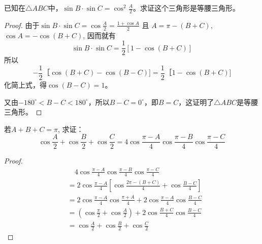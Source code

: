     

\begin{example}
    已知在$\triangle ABC$中，$\sin B\cdot \sin C=\cos^2\frac{A}{2}$。求证这个三角形是等腰三角形。
\end{example}


\begin{proof}
由于$\sin B\cdot \sin C=\cos\frac{A}{2}=\frac{1+\cos A}{2}$
且 $A=\pi-(B+C)$, $\cos A=-\cos(B+C)$, 因而就有
\[\sin B\cdot \sin C =\frac{1}{2} [1-\cos (B+C) ] \]
所以
\[-\frac{1}{2}［\cos (B+C) -\cos (B-C) ]
=\frac{1}{2}［1-\cos (B+C)]\]
化简上式，得$\cos (B-C) =1$。

又由$-180^{\circ}<B-C<180^{\circ}$，所以$B-C=0^{\circ}$，即$B=C$，这证明了$\triangle ABC$是等腰三角形。    
\end{proof}


\begin{example}
若$A+B+C=\pi$, 求证：
$$\cos\frac{A}{2}+\cos \frac{B}{2}+\cos \frac{C}{2}=4\cos\frac{\pi-A}{4}\cos\frac{\pi-B}{4}\cos\frac{\pi-C}{4}$$  
\end{example}

\begin{proof}
\[\begin{split}
&\quad  4\cos\frac{\pi-A}{4}\cos\frac{\pi-B}{4}\cos\frac{\pi-C}{4}\\
&= 2\cos\frac{\pi-A}{4}\left[\cos\frac{2\pi-(B+C)}{4}+\cos\frac{B-C}{4}\right]\\
&= 2\cos\frac{\pi-A}{4}  \cos\frac{\pi+A}{4} +2\cos\frac{\pi-A}{4} \cos\frac{B-C}{4} \\
&=\left(\cos\frac{\pi}{2}+\cos\frac{A}{2}\right)+2\cos\frac{B+C}{4}\cos\frac{B-C}{4}   \\
&=\cos\frac{A}{2}+\cos \frac{B}{2}+\cos \frac{C}{2}
\end{split}\] 
\end{proof}

